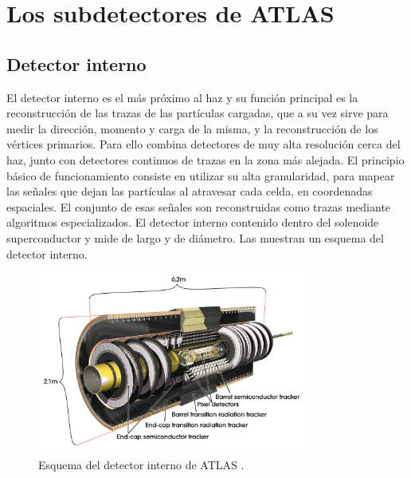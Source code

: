\section{Los subdetectores de ATLAS}

\subsection{Detector interno}

El detector interno es el más próximo al haz y su función principal es la reconstrucción de las trazas de las partículas cargadas, que a su vez sirve para medir la dirección, momento y carga de la misma, y la reconstrucción de los vértices primarios. Para ello combina detectores de muy alta resolución cerca del haz, junto con detectores continuos de trazas en la zona más alejada. El principio básico de funcionamiento consiste en utilizar su alta granularidad, para mapear las señales que dejan las partículas al atravesar cada celda, en coordenadas espaciales. El conjunto de esas señales son reconstruidas como trazas mediante algoritmos especializados. El detector interno contenido dentro del solenoide superconductor y mide  de largo y  de diámetro. Las  muestran un esquema del detector interno.

\begin{figure}
\centering
  \includegraphics[width=0.8\textwidth]{images/lhc/pixel_2.jpg}
  \caption{Esquema del detector interno de ATLAS \cite{Pequenao:1095926}.}
  \label{fig:pixel_1}
\end{figure}

